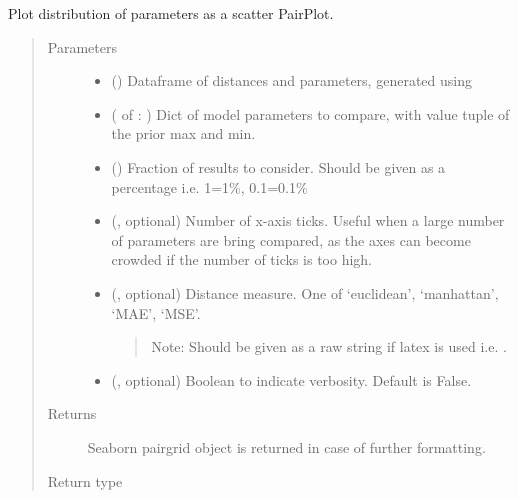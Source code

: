 \documentclass[letterpaper,10pt,english]{sphinxmanual}
\begin{document}

\begin{fulllineitems}
\label{\detokenize{misc:bayescmd.results_handling.scatter_dist_plot}}
Plot distribution of parameters as a scatter PairPlot.
\begin{quote}\begin{description}
\item[{Parameters}] \leavevmode\begin{itemize}
\item {} 
 () \textendash{} Dataframe of distances and parameters, generated using
{\hyperref[\detokenize{misc:bayescmd.results_handling.data_import}]{}}

\item {} 
 ( of : ) \textendash{} Dict of model parameters to compare, with value tuple of the prior max
and min.

\item {} 
 () \textendash{} Fraction of results to consider. Should be given as a percentage i.e.
1=1\%, 0.1=0.1\%

\item {} 
 (, optional) \textendash{} Number of x-axis ticks. Useful when a large number of parameters are
bring compared, as the axes can become crowded if the number of ticks
is too high.

\item {} 
 (, optional) \textendash{} 
Distance measure. One of ‘euclidean’, ‘manhattan’, ‘MAE’, ‘MSE’.
\begin{quote}

Note: Should be given  as a raw string if latex is used i.e.
.
\end{quote}


\item {} 
 (, optional) \textendash{} Boolean to indicate verbosity. Default is False.

\end{itemize}

\item[{Returns}] \leavevmode
{} \textendash{} Seaborn pairgrid object is returned in case of further formatting.

\item[{Return type}] \leavevmode
{}

\end{description}\end{quote}

\end{fulllineitems}
\end{document}
